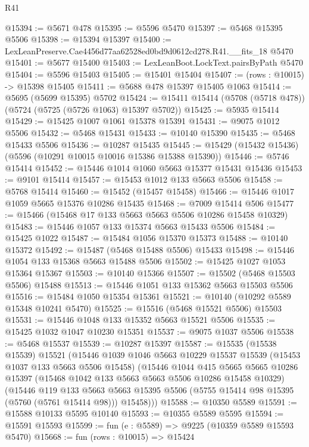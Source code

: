 \begin{lexlean}{R41}
\begin{coremodule}
@15394 := @5671 @478
@15395 := @5596 @5470
@15397 := @5468 @15395 @5506
@15398 := @15394 @15397
@15400 := LexLeanPreserve.Cae4456d77aa62528ed0bd9d0612cd278.R41.__fits_18 @5470
@15401 := @5677 @15400
@15403 := LexLeanBoot.LockText.pairsByPath @5470
@15404 := @5596 @15403
@15405 := @15401 @15404
@15407 := (rows : @10015) -> @15398 @15405
@15411 := @5688 @478 @15397 @15405 @1063
@15414 := @5695 (@5699 @15395) @5702
@15424 := @15411 @15414 (@5708 (@5718 @478)) (@5724 (@5725 (@5726 @1063) @15397 @5702))
@15425 := @5935 @15414
@15429 := @15425 @1007 @1061 @15378 @15391
@15431 := @9075 @1012 @5506
@15432 := @5468 @15431
@15433 := @10140 @15390
@15435 := @5468 @15433 @5506
@15436 := @10287 @15435
@15445 := @15429 (@15432 @15436) (@5596 (@10291 @10015 @10016 @15386 @15388 @15390))
@15446 := @5746 @15414
@15452 := @15446 @1014 @1060 @5663 @15377 @15431 @15436
@15453 := @9101 @15414
@15457 := @15453 @1012 @133 @5663 @5506
@15458 := @5768 @15414
@15460 := @15452 (@15457 @15458)
@15466 := @15446 @1017 @1059 @5665 @15376 @10286 @15435
@15468 := @7009 @15414 @506
@15477 := @15466 (@15468 @17 @133 @5663 @5663 @5506 @10286 @15458 @10329)
@15483 := @15446 @1057 @133 @15374 @5663 @15433 @5506
@15484 := @15425 @1022
@15487 := @15484 @1056 @15370 @15373
@15488 := @10140 @15372
@15492 := @15487 (@5468 @15488 @5506) @15433
@15498 := @15446 @1054 @133 @15368 @5663 @15488 @5506
@15502 := @15425 @1027 @1053 @15364 @15367
@15503 := @10140 @15366
@15507 := @15502 (@5468 @15503 @5506) @15488
@15513 := @15446 @1051 @133 @15362 @5663 @15503 @5506
@15516 := @15484 @1050 @15354 @15361
@15521 := @10140 (@10292 @5589 @15348 @10241 @5470)
@15525 := @15516 (@5468 @15521 @5506) @15503
@15531 := @15446 @1048 @133 @15352 @5663 @15521 @5506
@15535 := @15425 @1032 @1047 @10230 @15351
@15537 := @9075 @1037 @5506
@15538 := @5468 @15537
@15539 := @10287 @15397
@15587 := @15535
    (@15538 @15539)
    @15521
    (@15446
      @1039
      @1046
      @5663
      @10229
      @15537
      @15539
      (@15453 @1037 @133 @5663 @5506 @15458)
      (@15446
        @1044
        @415
        @5665
        @5665
        @10286
        @15397
        (@15468 @1042 @133 @5663 @5663 @5506 @10286 @15458 @10329)
        (@15446
          @119
          @133
          @5663
          @5663
          @15395
          @5506
          (@5755 @15414 @98 @15395 (@5760 (@5761 @15414 @98)))
          @15458)))
@15588 := @10350 @5589
@15591 := @15588 @10133 @5595 @10140
@15593 := @10355 @5589 @5595
@15594 := @15591 @15593
@15599 := fun (e : @5589) => @9225 (@10359 @5589 @15593 @5470)
@15668 := fun (rows : @10015) =>
  @15424

\end{coremodule}
\end{lexlean}
